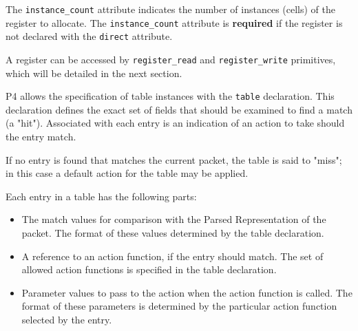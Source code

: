 \documentclass[12pt]{article}
\begin{document}

The \texttt{instance_count} attribute indicates the number of
instances (cells) of the register to allocate. The
\texttt{instance_count} attribute is \textbf{required} if the
register is not declared with the \texttt{direct} attribute.

%
%
%
%

A register can be accessed by \texttt{register_read} and
\texttt{register_write} primitives, which will be detailed in the
next section.


P4 allows the specification of table instances with the \texttt{table}
declaration. This declaration defines the exact set of fields that
should be examined to find a match (a "hit").  Associated with each
entry is an indication of an action to take should the entry match.

If no entry is found that matches the current packet, the table is said to
"miss"; in this case a default action for the table may be applied.

Each entry in a \matchaction table has the following parts:

\begin{itemize}
\item
The match values for comparison with the Parsed Representation of the packet.
The format of these values determined by the table declaration.
\item
A reference to an action function, if the entry should match. The set
of allowed action functions is specified in the table declaration.
\item
Parameter values to pass to the action when the action function is called.
The format of these parameters is determined by the particular action function
selected by the entry.
\end{itemize}
\end{document}
